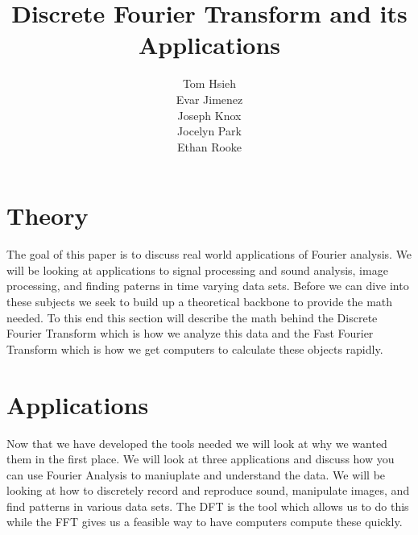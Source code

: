 \documentclass[11pt]{report}
\title{Discrete Fourier Transform and its Applications}
\author{Tom Hsieh\\
        Evar Jimenez\\
        Joseph Knox\\
        Jocelyn Park \\
        Ethan Rooke }
\begin{document}
\maketitle

\tableofcontents

\chapter{Theory}
  The goal of this paper is to discuss real world applications
  of Fourier analysis. We will be looking at applications to
  signal processing and sound analysis, image processing, and
  finding paterns in time varying data sets. Before we can
  dive into these subjects we seek to build up a theoretical
  backbone to provide the math needed. To this end this
  section will describe the math behind the Discrete Fourier Transform
  which is how we analyze this data and the Fast Fourier Transform
  which is how we get computers to calculate these objects rapidly.
  
  \newpage
  
  \newpage
\chapter{Applications}
  Now that we have developed the tools needed we will look at
  why we wanted them in the first place. We will look at three
  applications and discuss how you can use Fourier Analysis to
  maniuplate and understand the data. We will be looking at how
  to discretely record and reproduce sound, manipulate images,
  and find patterns in various data sets. The DFT is the tool
  which allows us to do this while the FFT gives us a feasible
  way to have computers compute these quickly.
  
  \newpage
  
  \newpage
  

  \nocite{*} %
  \printbibliography
\end{document}
